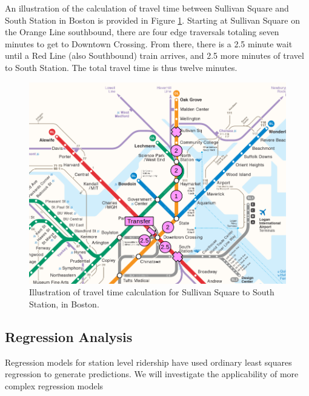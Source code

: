 \documentclass{article}
\begin{document}
An illustration of the calculation of travel time between Sullivan Square and South Station in Boston is provided in Figure \ref{fig:f2}. Starting at Sullivan Square on the Orange Line southbound, there are four edge traversals totaling seven minutes to get to Downtown Crossing. From there, there is a 2.5 minute wait until a Red Line (also Southbound) train arrives, and 2.5 more minutes of travel to South Station. The total travel time is thus twelve minutes. 

\begin{figure}[H]
\begin{center}\includegraphics[scale=0.8]{transfer_demonstration}\end{center}\caption{Illustration of travel time calculation for Sullivan Square to South Station, in Boston.}\label{fig:f2}
\end{figure}



\subsection{Regression Analysis}

Regression models for station level ridership have used ordinary least squares regression\cite{Kuby2004, Taylor2008, Currie2011, Durning2015, Gutierrez2011} to generate predictions. We will investigate the applicability of more complex regression models 






 

\pagebreak
\end{document}

